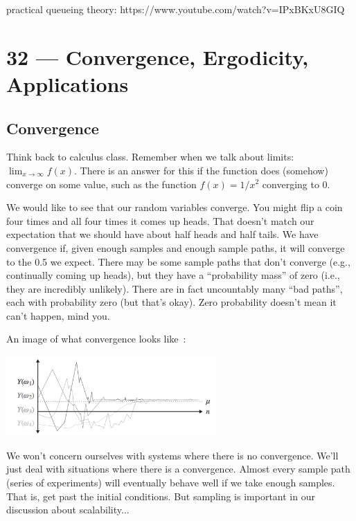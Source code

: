 \documentclass[a4paper]{report}
\begin{document}
practical queueing theory:  https://www.youtube.com/watch?v=IPxBKxU8GIQ





\chapter*{32 --- Convergence, Ergodicity, Applications}


\section*{Convergence}

Think back to calculus class. Remember when we talk about limits: $\lim_{x\to\infty} f(x)$. There is an answer for this if the function does (somehow) converge on some value, such as the function $f(x) = 1/x^{2}$ converging to 0.

We would like to see that our random variables converge. You might flip a coin four times and all four times it comes up heads. That doesn't match our expectation that we should have about half heads and half tails. We have convergence if, given enough samples and enough sample paths, it will converge to the 0.5 we expect. There may be some sample paths that don't converge (e.g., continually coming up heads), but they have a ``probability mass'' of zero (i.e., they are incredibly unlikely).  There are in fact uncountably many ``bad paths'', each with probability zero (but that's okay). Zero probability doesn't mean it can't happen, mind you.

An image of what convergence looks like~\cite{pmd}:

\begin{center}
	\includegraphics[width=0.6\textwidth]{images/convergence.png}
\end{center}

We won't concern ourselves with systems where there is no convergence. We'll just deal with situations where there is a convergence. Almost every sample path (series of experiments) will eventually behave well if we take enough samples. That is, get past the initial conditions. But sampling is important in our discussion about scalability...
\end{document}
